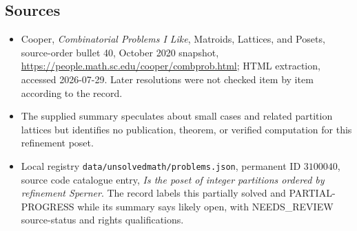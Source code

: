 \documentclass[11pt]{article}
\begin{document}
\subsection{Sources}
\begin{itemize}
\item Cooper, \emph{Combinatorial Problems I Like}, Matroids, Lattices, and Posets, source-order bullet 40, October 2020 snapshot, \url{https://people.math.sc.edu/cooper/combprob.html}; HTML extraction, accessed 2026-07-29. Later resolutions were not checked item by item according to the record.
\item The supplied summary speculates about small cases and related partition lattices but identifies no publication, theorem, or verified computation for this refinement poset.
\item Local registry \texttt{data/unsolvedmath/problems.json}, permanent ID $3100040$, source code catalogue entry, \emph{Is the poset of integer partitions ordered by refinement Sperner}. The record labels this partially solved and PARTIAL-PROGRESS while its summary says likely open, with NEEDS\_REVIEW source-status and rights qualifications.
\end{itemize}
\end{document}
